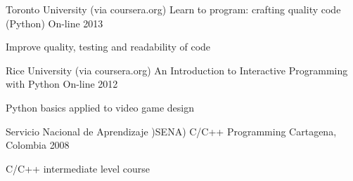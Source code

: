 \begin{cventries}
  \cventry
    {Toronto University (via coursera.org)} %
    {Learn to program: crafting quality code (Python)} %
    {On-line} %
    {2013} %
    {
      \begin{cvitems} %
        \item {Improve quality, testing and readability of code}
      \end{cvitems}
    }

  \cventry
    {Rice University (via coursera.org)} %
    {An Introduction to Interactive Programming with Python} %
    {On-line} %
    {2012} %
    {
      \begin{cvitems} %
        \item {Python basics applied to video game design}
      \end{cvitems}
    }
  \cventry
    {Servicio Nacional de Aprendizaje )SENA)} %
    {C/C++ Programming} %
    {Cartagena, Colombia} %
    {2008} %
    {
      \begin{cvitems} %
        \item {C/C++ intermediate level course}
      \end{cvitems}
    }

\end{cventries}
